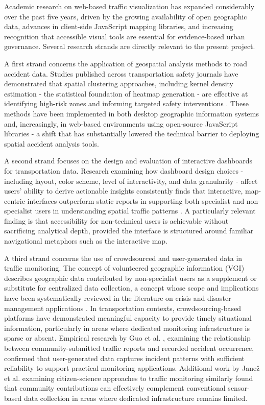 \documentclass[12pt,a4paper]{report}
\begin{document}
Academic research on web-based traffic visualization has expanded
considerably over the past five years, driven by the growing
availability of open geographic data, advances in client-side
JavaScript mapping libraries, and increasing recognition that
accessible visual tools are essential for evidence-based urban
governance. Several research strands are directly relevant to the
present project.

A first strand concerns the application of geospatial analysis methods
to road accident data. Studies published across transportation safety
journals have demonstrated that spatial clustering approaches,
including kernel density estimation - the statistical foundation of
heatmap generation - are effective at identifying high-risk zones and
informing targeted safety interventions \cite{endashaw2025,
salameh2024}. These methods have been implemented in both desktop
geographic information systems and, increasingly, in web-based
environments using open-source JavaScript libraries - a shift that has
substantially lowered the technical barrier to deploying spatial
accident analysis tools.

A second strand focuses on the design and evaluation of interactive
dashboards for transportation data. Research examining how dashboard
design choices - including layout, color scheme, level of
interactivity, and data granularity - affect users' ability to derive
actionable insights consistently finds that interactive, map-centric
interfaces outperform static reports in supporting both specialist and
non-specialist users in understanding spatial traffic patterns
\cite{praharaj2022, shu2023}. A particularly relevant finding is that
accessibility for non-technical users is achievable without sacrificing
analytical depth, provided the interface is structured around familiar
navigational metaphors such as the interactive map.

A third strand concerns the use of crowdsourced and user-generated
data in traffic monitoring. The concept of volunteered geographic
information (VGI) describes geographic data contributed by non-specialist
users as a supplement or substitute for centralized data collection,
a concept whose scope and implications have been systematically reviewed
in the literature on crisis and disaster management applications
\cite{herfort2021, tzavella2022}. In transportation contexts,
crowdsourcing-based platforms have demonstrated meaningful capacity to
provide timely situational information, particularly in areas where
dedicated monitoring infrastructure is sparse or absent. Empirical
research by Guo et al. \cite{guo2024}, examining the relationship
between community-submitted traffic reports and recorded accident
occurrence, confirmed that user-generated data captures incident
patterns with sufficient reliability to support practical monitoring
applications. Additional work by Janež et al. \cite{janez2022}
examining citizen-science approaches to traffic monitoring similarly
found that community contributions can effectively complement
conventional sensor-based data collection in areas where dedicated
infrastructure remains limited.
\end{document}
